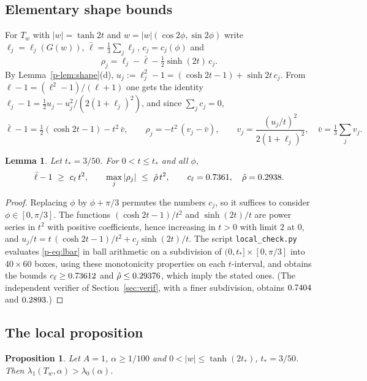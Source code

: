 \documentclass[11pt]{article}
\newtheorem{proposition}[theorem]{Proposition}
\newtheorem{lemma}[theorem]{Lemma}
\theoremstyle{remark}
\begin{document}
\subsection{Elementary shape bounds}

For $T_w$ with $|w|=\tanh2t$ and $w=|w|(\cos2\phi,\sin2\phi)$ write $\ell_j=\ell_j(G(w))$,
$\bar\ell=\frac13\sum_j\ell_j$, $c_j=c_j(\phi)$ and
\[
  \rho_j=\ell_j-\bar\ell-\tfrac12\sinh(2t)\,c_j .
\]
By Lemma~\ref{p-lem:shape}(d), $u_j:=\ell_j^2-1=(\cosh2t-1)+\sinh2t\,c_j$. From
$\ell-1=(\ell^2-1)/(\ell+1)$ one gets the identity
$\ell_j-1=\tfrac12u_j-u_j^2/(2(1+\ell_j)^2)$, and since $\sum_jc_j=0$,
\begin{equation}\label{p-eq:lbar}
  \bar\ell-1=\tfrac12(\cosh2t-1)-t^2\,\bar v,\qquad \rho_j=-t^2\,(v_j-\bar v),\qquad
  v_j=\frac{(u_j/t)^2}{2(1+\ell_j)^2},\quad\bar v=\tfrac13\sum_jv_j .
\end{equation}

\begin{lemma}\label{p-lem:shapeconst}
Let $t_*=3/50$. For $0<t\le t_*$ and all $\phi$,
\[
  \bar\ell-1\ \ge\ c_\ell\,t^2,\qquad \max_j|\rho_j|\ \le\ \hat\rho\,t^2,\qquad
  c_\ell=0.7361,\quad\hat\rho=0.2938 .
\]
\end{lemma}

\begin{proof}
Replacing $\phi$ by $\phi+\pi/3$ permutes the numbers $c_j$, so it suffices to consider
$\phi\in[0,\pi/3]$. The functions $(\cosh2t-1)/t^2$ and $\sinh(2t)/t$ are power series in $t^2$
with positive coefficients, hence increasing in $t>0$ with limit $2$ at $0$, and
$u_j/t=t\,(\cosh2t-1)/t^2+c_j\sinh(2t)/t$. The script \texttt{local\_check.py} evaluates
\eqref{p-eq:lbar} in ball arithmetic on a subdivision of $(0,t_*]\times[0,\pi/3]$ into
$40\times60$ boxes, using these monotonicity properties on each $t$-interval, and obtains the
bounds $c_\ell\ge0.73612$ and $\hat\rho\le0.29376$, which imply the stated ones. (The
independent verifier of Section~\ref{sec:verif}, with a finer subdivision, obtains $0.7404$ and
$0.2893$.)
\end{proof}

\subsection{The local proposition}

\begin{proposition}\label{p-prop:local}
Let $A=1$, $\alpha\ge1/100$ and $0<|w|\le\tanh(2t_*)$, $t_*=3/50$. Then
$\lambda_1(T_w,\alpha)>\lambda_0(\alpha)$.
\end{proposition}
\end{document}
